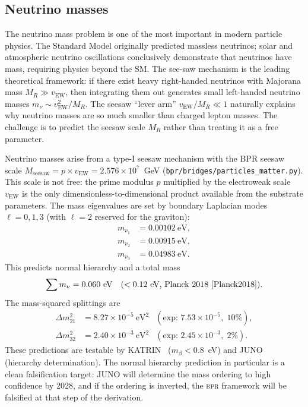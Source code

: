 \documentclass[aps,prd,twocolumn,superscriptaddress,longbibliography,nofootinbib]{revtex4-2}
\newcommand{\vEW}{v_{\mathrm{EW}}}
\newcommand{\bpr}{\textsc{bpr}}
\begin{document}
\subsection{Neutrino masses}

The neutrino mass problem is one of the most important in modern
particle physics.  The Standard Model originally predicted massless
neutrinos; solar and atmospheric neutrino oscillations conclusively
demonstrate that neutrinos have mass, requiring physics beyond the
SM.  The see-saw mechanism is the leading theoretical framework:
if there exist heavy right-handed neutrinos with Majorana mass
$M_R \gg \vEW$, then integrating them out generates small left-handed
neutrino masses $m_\nu \sim \vEW^2 / M_R$.  The seesaw ``lever arm''
$\vEW / M_R \ll 1$ naturally explains why neutrino masses are so
much smaller than charged lepton masses.  The challenge is to predict
the seesaw scale $M_R$ rather than treating it as a free parameter.

Neutrino masses arise from a type-I seesaw mechanism with the BPR
seesaw scale $M_{\mathrm{seesaw}} = p \times \vEW = 2.576 \times
10^7$~GeV (\texttt{bpr/bridges/particles\_matter.py}).  This scale
is not free: the prime modulus $p$ multiplied by the electroweak
scale $\vEW$ is the only dimensionless-to-dimensional product
available from the substrate parameters.  The mass
eigenvalues are set by boundary Laplacian modes $\ell = 0, 1, 3$
(with $\ell = 2$ reserved for the graviton):
\begin{align}
m_{\nu_1} &= 0.00102~\text{eV}, \nonumber \\
m_{\nu_2} &= 0.00915~\text{eV}, \nonumber \\
m_{\nu_3} &= 0.04983~\text{eV}.
\label{eq:neutrino_masses}
\end{align}
This predicts normal hierarchy and a total mass
\begin{equation}
\sum m_\nu = 0.060~\text{eV} \quad (< 0.12~\text{eV, Planck
2018~\cite{Planck2018}}).
\label{eq:sum_mnu}
\end{equation}
The mass-squared splittings are
\begin{align}
\Delta m^2_{21} &= 8.27 \times 10^{-5}~\text{eV}^2
  &\!\!\!(\text{exp: } 7.53 \times 10^{-5},\; 10\%), \nonumber \\
\Delta m^2_{32} &= 2.40 \times 10^{-3}~\text{eV}^2
  &\!\!\!(\text{exp: } 2.45 \times 10^{-3},\; 2\%).
\label{eq:dm2}
\end{align}
These predictions are testable by KATRIN~\cite{KATRIN2022}
($m_\beta < 0.8$~eV) and JUNO~\cite{JUNO2022} (hierarchy
determination).  The normal hierarchy prediction in particular is
a clean falsification target: JUNO will determine the mass ordering
to high confidence by 2028, and if the ordering is inverted,
the \bpr{} framework will be falsified at that step of the derivation.
\end{document}
